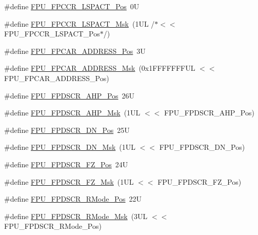 \begin{DoxyCompactItemize}
\item 
\#define \hyperlink{group___c_m_s_i_s___f_p_u_ga803bf3f6d15b04deaad0801bee5b35ed}{F\+P\+U\+\_\+\+F\+P\+C\+C\+R\+\_\+\+L\+S\+P\+A\+C\+T\+\_\+\+Pos}~0U
\item 
\#define \hyperlink{group___c_m_s_i_s___f_p_u_ga86e7c2fa52ba65c3b535dfa33f2586eb}{F\+P\+U\+\_\+\+F\+P\+C\+C\+R\+\_\+\+L\+S\+P\+A\+C\+T\+\_\+\+Msk}~(1\+U\+L /$\ast$$<$$<$ F\+P\+U\+\_\+\+F\+P\+C\+C\+R\+\_\+\+L\+S\+P\+A\+C\+T\+\_\+\+Pos$\ast$/)
\item 
\#define \hyperlink{group___c_m_s_i_s___f_p_u_gaf45377b7e45be8517ddbcf2028b80ae7}{F\+P\+U\+\_\+\+F\+P\+C\+A\+R\+\_\+\+A\+D\+D\+R\+E\+S\+S\+\_\+\+Pos}~3U
\item 
\#define \hyperlink{group___c_m_s_i_s___f_p_u_ga517d89370c81325c5387b9c3085ac554}{F\+P\+U\+\_\+\+F\+P\+C\+A\+R\+\_\+\+A\+D\+D\+R\+E\+S\+S\+\_\+\+Msk}~(0x1\+F\+F\+F\+F\+F\+F\+F\+U\+L $<$$<$ F\+P\+U\+\_\+\+F\+P\+C\+A\+R\+\_\+\+A\+D\+D\+R\+E\+S\+S\+\_\+\+Pos)
\item 
\#define \hyperlink{group___c_m_s_i_s___f_p_u_ga138f54bc002629ab3e4de814c58abb29}{F\+P\+U\+\_\+\+F\+P\+D\+S\+C\+R\+\_\+\+A\+H\+P\+\_\+\+Pos}~26U
\item 
\#define \hyperlink{group___c_m_s_i_s___f_p_u_gab2789cebebda5fda8c4e9d87e24f32be}{F\+P\+U\+\_\+\+F\+P\+D\+S\+C\+R\+\_\+\+A\+H\+P\+\_\+\+Msk}~(1\+U\+L $<$$<$ F\+P\+U\+\_\+\+F\+P\+D\+S\+C\+R\+\_\+\+A\+H\+P\+\_\+\+Pos)
\item 
\#define \hyperlink{group___c_m_s_i_s___f_p_u_ga41776b80fa450ef2ea6d3fee89aa35f2}{F\+P\+U\+\_\+\+F\+P\+D\+S\+C\+R\+\_\+\+D\+N\+\_\+\+Pos}~25U
\item 
\#define \hyperlink{group___c_m_s_i_s___f_p_u_ga40c2d4a297ca2ceffe174703a4ad17f6}{F\+P\+U\+\_\+\+F\+P\+D\+S\+C\+R\+\_\+\+D\+N\+\_\+\+Msk}~(1\+U\+L $<$$<$ F\+P\+U\+\_\+\+F\+P\+D\+S\+C\+R\+\_\+\+D\+N\+\_\+\+Pos)
\item 
\#define \hyperlink{group___c_m_s_i_s___f_p_u_gab3c2fc96e312ba47b902d5f80d9b8575}{F\+P\+U\+\_\+\+F\+P\+D\+S\+C\+R\+\_\+\+F\+Z\+\_\+\+Pos}~24U
\item 
\#define \hyperlink{group___c_m_s_i_s___f_p_u_gaae7d901442d4af97c6d22939cffc8ad9}{F\+P\+U\+\_\+\+F\+P\+D\+S\+C\+R\+\_\+\+F\+Z\+\_\+\+Msk}~(1\+U\+L $<$$<$ F\+P\+U\+\_\+\+F\+P\+D\+S\+C\+R\+\_\+\+F\+Z\+\_\+\+Pos)
\item 
\#define \hyperlink{group___c_m_s_i_s___f_p_u_ga7aeedf36be8f170dd3e276028e8e29ed}{F\+P\+U\+\_\+\+F\+P\+D\+S\+C\+R\+\_\+\+R\+Mode\+\_\+\+Pos}~22U
\item 
\#define \hyperlink{group___c_m_s_i_s___f_p_u_ga449beb50211f8e97df6b2640c82c4741}{F\+P\+U\+\_\+\+F\+P\+D\+S\+C\+R\+\_\+\+R\+Mode\+\_\+\+Msk}~(3\+U\+L $<$$<$ F\+P\+U\+\_\+\+F\+P\+D\+S\+C\+R\+\_\+\+R\+Mode\+\_\+\+Pos)
$$
\end{DoxyCompactItemize}

